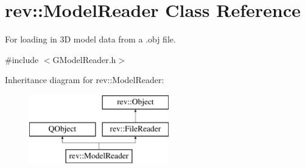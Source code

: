 \hypertarget{classrev_1_1_model_reader}{}\section{rev\+::Model\+Reader Class Reference}
\label{classrev_1_1_model_reader}


For loading in 3D model data from a .obj file.  




{\ttfamily \#include $<$G\+Model\+Reader.\+h$>$}

Inheritance diagram for rev\+::Model\+Reader\+:\begin{figure}[H]
\begin{center}
\leavevmode
\includegraphics[height=3.000000cm]{classrev_1_1_model_reader}
\end{center}
\end{figure}
